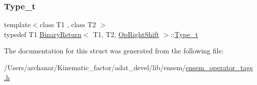 \mbox{\label{structBinaryReturn_3_01T1_00_01T2_00_01OpRightShift_01_4_a669ff609f8117f57e60c22cb953ff2d6}} 
\subsubsection{\texorpdfstring{Type\_t}{Type\_t}\hspace{0.1cm}{\footnotesize\ttfamily [2/2]}}
{\footnotesize\ttfamily template$<$class T1 , class T2 $>$ \\
typedef T1 \mbox{\hyperlink{structBinaryReturn}{Binary\+Return}}$<$ T1, T2, \mbox{\hyperlink{structOpRightShift}{Op\+Right\+Shift}} $>$\+::\mbox{\hyperlink{structBinaryReturn_3_01T1_00_01T2_00_01OpRightShift_01_4_a669ff609f8117f57e60c22cb953ff2d6}{Type\+\_\+t}}}



The documentation for this struct was generated from the following file\+:\begin{DoxyCompactItemize}
\item 
/\+Users/archanar/\+Kinematic\+\_\+factor/adat\+\_\+devel/lib/ensem/\mbox{\hyperlink{lib_2ensem_2ensem__operator__tags_8h}{ensem\+\_\+operator\+\_\+tags.\+h}}\end{DoxyCompactItemize}
